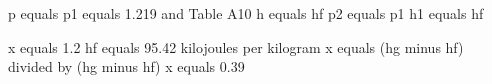p equals p1 equals 1.219 and Table A10  
h equals hf  
p2 equals p1  
h1 equals hf  

x equals 1.2  
hf equals 95.42 kilojoules per kilogram  
x equals (hg minus hf) divided by (hg minus hf)  
x equals 0.39